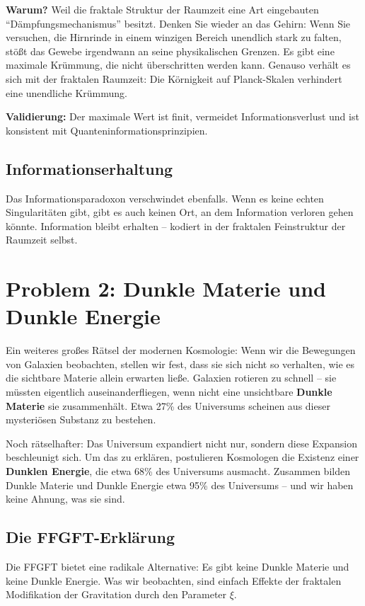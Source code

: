 \textbf{Warum?} Weil die fraktale Struktur der Raumzeit eine Art eingebauten \enquote{Dämpfungsmechanismus} besitzt. Denken Sie wieder an das Gehirn: Wenn Sie versuchen, die Hirnrinde in einem winzigen Bereich unendlich stark zu falten, stößt das Gewebe irgendwann an seine physikalischen Grenzen. Es gibt eine maximale Krümmung, die nicht überschritten werden kann. Genauso verhält es sich mit der fraktalen Raumzeit: Die Körnigkeit auf Planck-Skalen verhindert eine unendliche Krümmung.

\textbf{Validierung:} Der maximale Wert ist finit, vermeidet Informationsverlust und ist konsistent mit Quanteninformationsprinzipien.

\subsection{Informationserhaltung}

Das Informationsparadoxon verschwindet ebenfalls. Wenn es keine echten Singularitäten gibt, gibt es auch keinen Ort, an dem Information verloren gehen könnte. Information bleibt erhalten – kodiert in der fraktalen Feinstruktur der Raumzeit selbst.

\section{Problem 2: Dunkle Materie und Dunkle Energie}

Ein weiteres großes Rätsel der modernen Kosmologie: Wenn wir die Bewegungen von Galaxien beobachten, stellen wir fest, dass sie sich nicht so verhalten, wie es die sichtbare Materie allein erwarten ließe. Galaxien rotieren zu schnell – sie müssten eigentlich auseinanderfliegen, wenn nicht eine unsichtbare \textbf{Dunkle Materie} sie zusammenhält. Etwa 27\% des Universums scheinen aus dieser mysteriösen Substanz zu bestehen.

Noch rätselhafter: Das Universum expandiert nicht nur, sondern diese Expansion beschleunigt sich. Um das zu erklären, postulieren Kosmologen die Existenz einer \textbf{Dunklen Energie}, die etwa 68\% des Universums ausmacht. Zusammen bilden Dunkle Materie und Dunkle Energie etwa 95\% des Universums – und wir haben keine Ahnung, was sie sind.

\subsection{Die FFGFT-Erklärung}

Die FFGFT bietet eine radikale Alternative: Es gibt keine Dunkle Materie und keine Dunkle Energie. Was wir beobachten, sind einfach Effekte der fraktalen Modifikation der Gravitation durch den Parameter $\xi$.


